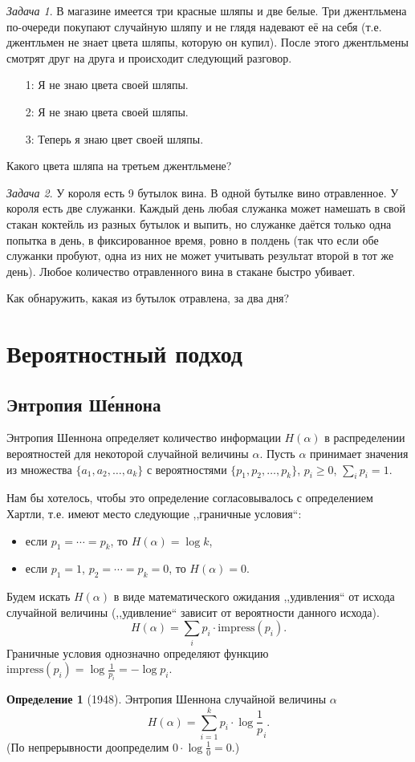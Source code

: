 \documentclass[12pt]{article}
\newcommand{\seqn}[2]{{#1}_1,{#1}_2,\dotsc,{#1}_{#2}}
\theoremstyle{definition}
\newtheorem{definition}{Определение}[section]
\theoremstyle{plain}
\theoremstyle{remark}
\newtheorem{problem}{Задача}[section]
\begin{document}
\begin{problem}
    В магазине имеется три красные шляпы и две белые. Три джентльмена по-очереди покупают случайную шляпу и не глядя 
    надевают её на себя (т.е. джентльмен не знает цвета шляпы, которую он купил). После этого джентльмены смотрят друг
    на друга и происходит следующий разговор.
    \begin{itemize}
        \item[1:] Я не знаю цвета своей шляпы.
        \item[2:] Я не знаю цвета своей шляпы.
        \item[3:] Теперь я знаю цвет своей шляпы.
    \end{itemize}
    Какого цвета шляпа на третьем джентльмене?
\end{problem}

\begin{problem}
    У короля есть 9 бутылок вина. В одной бутылке вино отравленное.      
    У короля есть две служанки. Каждый день любая служанка может намешать в свой стакан коктейль из разных бутылок и выпить, но служанке даётся только одна попытка в день, в фиксированное время, ровно в полдень (так что если обе служанки пробуют, одна из них не может учитывать результат второй в тот же день). Любое количество отравленного вина в стакане быстро убивает.
    
    Как обнаружить, какая из бутылок отравлена, за два дня?
\end{problem}


\section{Вероятностный подход}
\subsection{Энтропия Ш\'{е}ннона}

Энтропия Шеннона определяет количество информации \(H(\alpha)\) в распределении
вероятностей для некоторой случайной величины \(\alpha\).  Пусть \(\alpha\)
принимает значения из множества \(\{\seqn{a}{k}\}\) с вероятностями
\(\{\seqn{p}{k}\}\), \(p_i\ge 0 \), \(\sum_ip_i=1\).

Нам бы хотелось, чтобы это определение согласовывалось с определением Хартли, т.е. имеют место следующие ,,граничные условия``:
\begin{itemize}
\item если \(p_1=\dotsb=p_k\), то \(H(\alpha) = \log k\),
\item если \(p_1=1\), \(p_2=\dotsb=p_k=0\), то \(H(\alpha) = 0\).
\end{itemize}
Будем искать \(H(\alpha)\) в виде математического ожидания ,,удивления`` от исхода случайной величины (,,удивление`` зависит от вероятности данного исхода).
\[H(\alpha) = \sum_i p_i\cdot \mathrm{impress}(p_i).\]
Граничные условия однозначно определяют функцию \(\mathrm{impress}(p_i) = \log\frac{1}{p_i} = -\log p_i\).
\begin{definition}[1948]
Энтропия Шеннона случайной величины \(\alpha\) 
\[
H(\alpha) = \sum_{i=1}^k p_i\cdot\log\frac1p_i.
\]
(По непрерывности доопределим \(0\cdot \log\frac10 = 0\).)
\end{definition}
\end{document}
